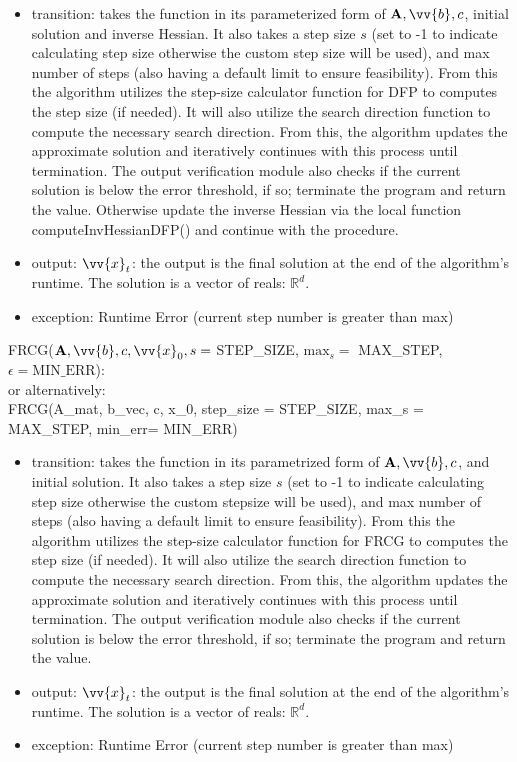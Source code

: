 \documentclass[12pt, titlepage]{article}
\begin{document}
\begin{itemize}
\item transition: takes the function in its parameterized form of $\mathbf{A},\vv{b},c$, initial solution and inverse Hessian. It also takes a step size $s$ (set to -1 to indicate calculating step size otherwise the custom step size will be used), and max number of steps (also having a default limit to ensure feasibility). From this the algorithm utilizes the step-size calculator function for DFP to computes the step size (if needed). It will also utilize the search direction function to compute the necessary search direction. From this, the algorithm updates the approximate solution and iteratively continues with this process until termination. The output verification module also checks if the current solution is below the error threshold, if so; terminate the program and return the value. Otherwise update the inverse Hessian via the local function computeInvHessianDFP() and continue with the procedure.
\item output: $\vv{x}_t$: the output is the final solution at the end of the algorithm's runtime. The solution is a vector of reals: $\mathbb{R}^d$.
\item exception: Runtime Error (current step number is greater than max)
\end{itemize}
FRCG($\mathbf{A}, \vv{b}, c, \vv{x}_{0}, s = $ STEP\_SIZE, $\text{max}_s =$ MAX\_STEP, $\epsilon=\text{MIN\_ERR}$):
\\
or alternatively:
\\
FRCG(A\_mat, b\_vec, c, x\_0, step\_size = STEP\_SIZE, max\_s = MAX\_STEP, min\_err= MIN\_ERR)
\begin{itemize}
\begin{itemize}
\item transition: takes the function in its parametrized form of $\mathbf{A},\vv{b},c$, and initial solution. It also takes a step size $s$ (set to -1 to indicate calculating step size otherwise the custom stepsize will be used), and max number of steps (also having a default limit to ensure feasibility). From this the algorithm utilizes the step-size calculator function for FRCG to computes the step size (if needed). It will also utilize the search direction function to compute the necessary search direction. From this, the algorithm updates the approximate solution and iteratively continues with this process until termination. The output verification module also checks if the current solution is below the error threshold, if so; terminate the program and return the value.
\item output: $\vv{x}_t$: the output is the final solution at the end of the algorithm's runtime. The solution is a vector of reals: $\mathbb{R}^d$.
\item exception: Runtime Error (current step number is greater than max)
\end{itemize}
\end{itemize}
\end{document}
